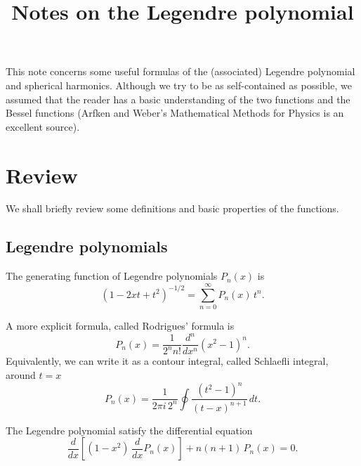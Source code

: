 \documentclass[11pt]{article}
\begin{document}
\title{Notes on the Legendre polynomial}
\author{ \vspace{-10ex} }
\date{ \vspace{-10ex} }
\maketitle


This note concerns some useful formulas of
the (associated) Legendre polynomial
and spherical harmonics.
%
Although we try to be as self-contained as possible,
we assumed that the reader
has a basic understanding of the two functions
and the Bessel functions
(Arfken and Weber's Mathematical Methods for Physics\cite{arfken}
is an excellent source).



\section{Review}



We shall briefly review some definitions and basic properties of the functions.


\subsection{Legendre polynomials}



The generating function of Legendre polynomials $P_n(x)$ is
%
\begin{equation}
  (1 - 2 x t + t^2)^{-1/2}
=
  \sum_{n = 0}^\infty P_n(x) \, t^n.
  \label{eq:legendre_gf}
\end{equation}

A more explicit formula, called Rodrigues' formula is
%
\begin{equation}
  P_n(x)
=
  \frac{1}{2^n n!}
  \frac{d^n}{dx^n}
  (x^2 - 1)^n.
  \label{eq:legendre_rodrigues}
\end{equation}
%
Equivalently, we can write it as a contour integral,
called Schlaefli integral, around $t = x$
\begin{equation}
  P_n(x)
=
  \frac{1}{2\pi i \, 2^n}
  \oint
  \frac{ (t^2 - 1)^n } { (t - x)^{n+1} } \, dt.
  \label{eq:legendre_schlaefli}
\end{equation}


The Legendre polynomial satisfy the differential equation
\begin{equation}
  \frac{d}{dx}
  \left[
    (1 - x^2) \, \frac{d}{dx} P_n(x)
  \right]
+ n (n + 1) \, P_n(x) = 0.
\label{eq:legendre_diffeq}
\end{equation}
\end{document}
